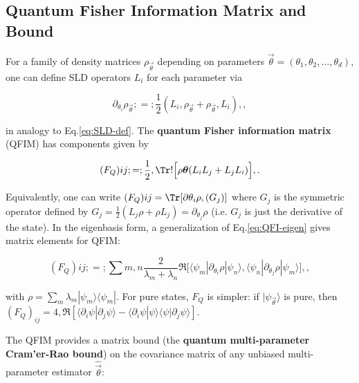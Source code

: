 \subsection{Quantum Fisher Information Matrix and Bound}



For a family of density matrices $\rho_{\vec{\theta}}$ depending on parameters $\vec{\theta} = (\theta_1,\theta_2,\ldots,\theta_d)$, one can define SLD operators $L_i$ for each parameter via

\begin{equation}

\partial_{\theta_i} \rho_{\vec{\theta}} ;=; \frac{1}{2}(L_i,\rho_{\vec{\theta}} + \rho_{\vec{\theta}},L_i) ,,

\end{equation}

in analogy to Eq.\eqref{eq:SLD-def}. The \textbf{quantum Fisher information matrix} (QFIM) has components given by

\begin{equation}

(F_Q){ij} ;=; \frac{1}{2}, \Tr!\Big[\rho{\vec{\theta}} (L_i L_j + L_j L_i)\Big] ,.

\label{eq:QFIM-def}

\end{equation}

Equivalently, one can write $(F_Q){ij} = \Tr[\partial{\theta_i}\rho, (G_j)]$ where $G_j$ is the symmetric operator defined by $G_j = \frac{1}{2}(L_j \rho + \rho L_j) = \partial_{\theta_j}\rho$ (i.e. $G_j$ is just the derivative of the state). In the eigenbasis form, a generalization of Eq.\eqref{eq:QFI-eigen} gives matrix elements for QFIM:

\begin{equation}

(F_Q){ij} ;=; \sum{m,n} \frac{2}{\lambda_m + \lambda_n} \Re\big[\langle \psi_m|\partial_{\theta_i}\rho|\psi_n\rangle, \langle \psi_n|\partial_{\theta_j}\rho|\psi_m\rangle\big] ,,

\end{equation}

with $\rho = \sum_m \lambda_m |\psi_m\rangle\langle \psi_m|$. For pure states, $F_Q$ is simpler: if $|\psi_{\vec{\theta}}\rangle$ is pure, then $(F_Q)_{ij} = 4,\Re[\langle \partial_i \psi | \partial_j \psi \rangle - \langle \partial_i \psi|\psi\rangle\langle\psi|\partial_j \psi\rangle]$.



The QFIM provides a matrix bound (the \textbf{quantum multi-parameter Cram'er-Rao bound}) on the covariance matrix of any unbiased multi-parameter estimator $\hat{\vec{\theta}}$:

